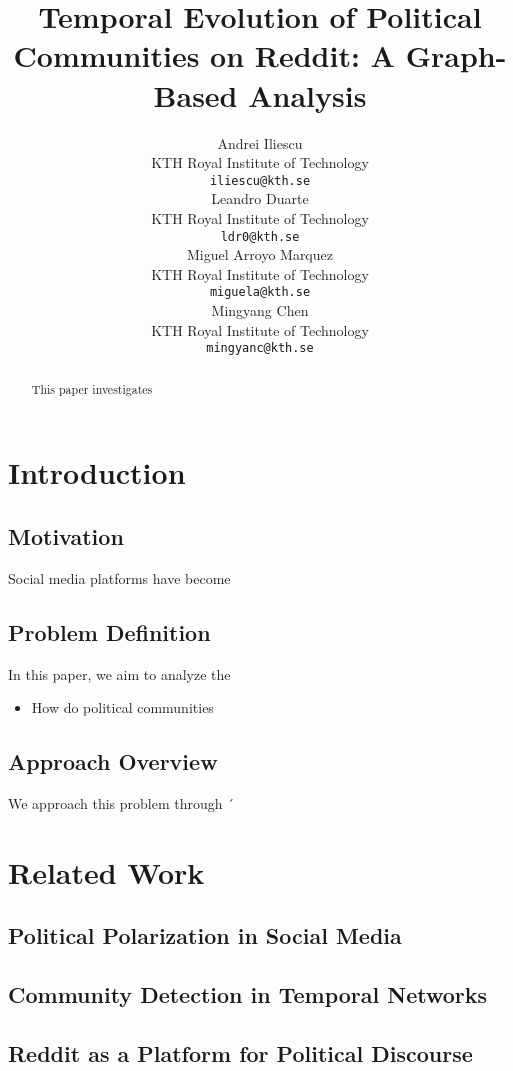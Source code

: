\documentclass{article}
\title{Temporal Evolution of Political Communities on Reddit: A Graph-Based Analysis}
\author{
  Andrei Iliescu \\
  KTH Royal Institute of Technology\\
  \texttt{iliescu@kth.se} \\
  \And
  Leandro Duarte \\
  KTH Royal Institute of Technology\\
  \texttt{ldr0@kth.se} \\
  \And
  Miguel Arroyo Marquez \\
  KTH Royal Institute of Technology\\
  \texttt{miguela@kth.se} \\
  \And
  Mingyang Chen \\
  KTH Royal Institute of Technology\\
  \texttt{mingyanc@kth.se} \\
}
\begin{document}
\maketitle

\begin{abstract}
  This paper investigates 
\end{abstract}

\section{Introduction}

\subsection{Motivation}
Social media platforms have become 

\subsection{Problem Definition}
In this paper, we aim to analyze the 
\begin{itemize}
    \item How do political communities 
\end{itemize}

\subsection{Approach Overview}
We approach this problem through ´

\section{Related Work}

\subsection{Political Polarization in Social Media}

\subsection{Community Detection in Temporal Networks}

\subsection{Reddit as a Platform for Political Discourse}
\end{document}
